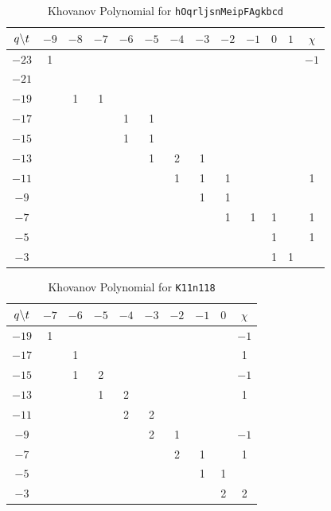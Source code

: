 \documentclass{article}
\theoremstyle{plain}
\begin{document}
        \begin{table}
            \centering
            \begin{tabular}{| c | c | c | c | c | c | c | c | c | c | c | c | c |}
                \hline
                $q\symbol{92}t$&$-9$&$-8$&$-7$&$-6$&$-5$&$-4$&$-3$&$-2$&$-1$&$0$&$1$&$\chi$\\
                \hline
                $-23$&1&&&&&&&&&&&$-1$\\
                \hline
                $-21$&&&&&&&&&&&&\\
                \hline
                $-19$&&1&1&&&&&&&&&\\
                \hline
                $-17$&&&&1&1&&&&&&&\\
                \hline
                $-15$&&&&1&1&&&&&&&\\
                \hline
                $-13$&&&&&1&2&1&&&&&\\
                \hline
                $-11$&&&&&&1&1&1&&&&1\\
                \hline
                $-9$&&&&&&&1&1&&&&\\
                \hline
                $-7$&&&&&&&&1&1&1&&1\\
                \hline
                $-5$&&&&&&&&&&1&&1\\
                \hline
                $-3$&&&&&&&&&&1&1&\\
                \hline
            \end{tabular}
            \caption{Khovanov Polynomial for \texttt{hOqrljsnMeipFAgkbcd}}
        \end{table}
        \begin{table}
            \centering
            \begin{tabular}{| c | c | c | c | c | c | c | c | c | c |}
                \hline
                $q\symbol{92}t$&$-7$&$-6$&$-5$&$-4$&$-3$&$-2$&$-1$&$0$&$\chi$\\
                \hline
                $-19$&1&&&&&&&&$-1$\\
                \hline
                $-17$&&1&&&&&&&1\\
                \hline
                $-15$&&1&2&&&&&&$-1$\\
                \hline
                $-13$&&&1&2&&&&&1\\
                \hline
                $-11$&&&&2&2&&&&\\
                \hline
                $-9$&&&&&2&1&&&$-1$\\
                \hline
                $-7$&&&&&&2&1&&1\\
                \hline
                $-5$&&&&&&&1&1&\\
                \hline
                $-3$&&&&&&&&2&2\\
                \hline
            \end{tabular}
            \caption{Khovanov Polynomial for \texttt{K11n118}}
        \end{table}
\end{document}
